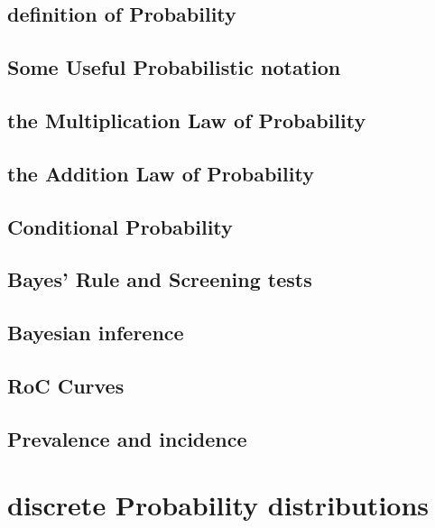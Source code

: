 \documentclass[12pt,]{article}
\theoremstyle{definition}
\theoremstyle{definition}
\theoremstyle{definition}
\theoremstyle{remark}
\begin{document}
\subsection{definition of Probability}\label{definition-of-probability}

\subsection{Some Useful Probabilistic
notation}\label{some-useful-probabilistic-notation}

\subsection{the Multiplication Law of
Probability}\label{the-multiplication-law-of-probability}

\subsection{the Addition Law of
Probability}\label{the-addition-law-of-probability}

\subsection{Conditional Probability}\label{conditional-probability}

\subsection{Bayes' Rule and Screening
tests}\label{bayes-rule-and-screening-tests}

\subsection{Bayesian inference}\label{bayesian-inference}

\subsection{RoC Curves}\label{roc-curves}

\subsection{Prevalence and incidence}\label{prevalence-and-incidence}

\section{discrete Probability
distributions}\label{discrete-probability-distributions}
\end{document}
